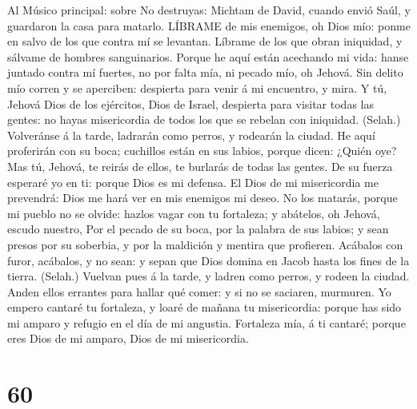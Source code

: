  Al Músico principal: sobre No destruyas: Michtam de David,
cuando envió Saúl, y guardaron la casa para matarlo. LÍBRAME de mis
enemigos, oh Dios mío: ponme en salvo de los que contra mí se levantan.
 Líbrame de los que obran iniquidad, y sálvame de hombres
sanguinarios.  Porque he aquí están acechando mi vida: hanse
juntado contra mí fuertes, no por falta mía, ni pecado mío, oh Jehová.
 Sin delito mío corren y se aperciben: despierta para venir
á mi encuentro, y mira.  Y tú, Jehová Dios de los ejércitos,
Dios de Israel, despierta para visitar todas las gentes: no hayas
misericordia de todos los que se rebelan con iniquidad. (Selah.)
 Volveránse á la tarde, ladrarán como perros, y rodearán la
ciudad.  He aquí proferirán con su boca; cuchillos están en
sus labios, porque dicen: ¿Quién oye?  Mas tú, Jehová, te
reirás de ellos, te burlarás de todas las gentes.  De su
fuerza esperaré yo en ti: porque Dios es mi defensa.  El
Dios de mi misericordia me prevendrá: Dios me hará ver en mis enemigos
mi deseo.  No los matarás, porque mi pueblo no se olvide:
hazlos vagar con tu fortaleza; y abátelos, oh Jehová, escudo nuestro,
 Por el pecado de su boca, por la palabra de sus labios; y
sean presos por su soberbia, y por la maldición y mentira que profieren.
 Acábalos con furor, acábalos, y no sean: y sepan que Dios
domina en Jacob hasta los fines de la tierra. (Selah.) 
Vuelvan pues á la tarde, y ladren como perros, y rodeen la ciudad.
 Anden ellos errantes para hallar qué comer: y si no se
saciaren, murmuren.  Yo empero cantaré tu fortaleza, y
loaré de mañana tu misericordia: porque has sido mi amparo y refugio en
el día de mi angustia.  Fortaleza mía, á ti cantaré; porque
eres Dios de mi amparo, Dios de mi misericordia.

\hypertarget{section-59}{%
\section{60}\label{section-59}}

